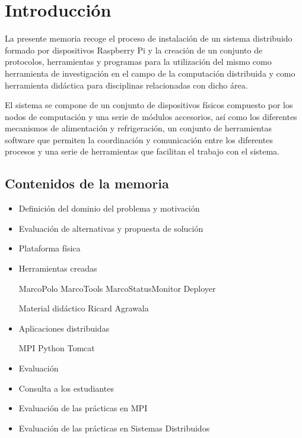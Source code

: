 \chapter{Introducción}

La presente memoria recoge el proceso de instalación de un sistema distribuido formado por dispositivos Raspberry Pi y la creación de un conjunto de protocolos, herramientas y programas para la utilización del mismo como herramienta de investigación en el campo de la computación distribuida y como herramienta didáctica para disciplinas relacionadas con dicho área.

El sistema se compone de un conjunto de dispositivos físicos compuesto por los nodos de computación y una serie de módulos accesorios, así como los diferentes mecanismos de alimentación y refrigeración, un conjunto de herramientas software que permiten la coordinación y comunicación entre los diferentes procesos y una serie de herramientas que facilitan el trabajo con el sistema.

\section{Contenidos de la memoria}

\begin{itemize}

\item Definición del dominio del problema y motivación

\item Evaluación de alternativas y propuesta de solución

\item Plataforma física

\item Herramientas creadas

	\subitem MarcoPolo
	\subitem MarcoTools
	\subitem MarcoStatusMonitor
	\subitem Deployer

	\subitem Material didáctico
		\subsubitem Ricard Agrawala


\item Aplicaciones distribuidas

	\subitem MPI
	\subitem Python
	\subitem Tomcat

\item Evaluación
	\item Consulta a los estudiantes
	\item Evaluación de las prácticas en MPI
	\item Evaluación de las prácticas en Sistemas Distribuidos
\end{itemize}